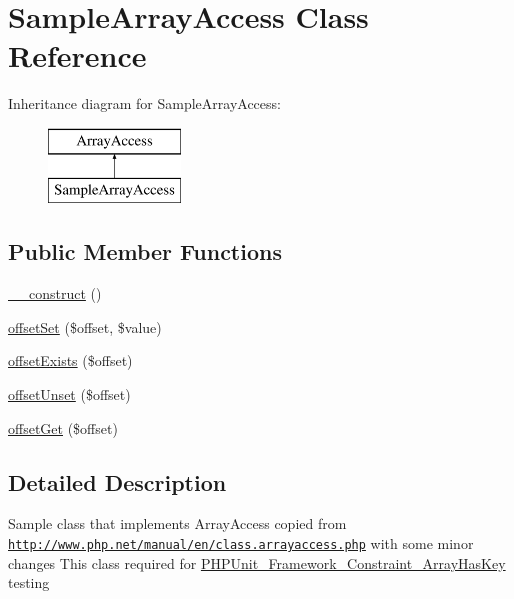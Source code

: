 \hypertarget{class_sample_array_access}{}\section{Sample\+Array\+Access Class Reference}
\label{class_sample_array_access}
Inheritance diagram for Sample\+Array\+Access\+:\begin{figure}[H]
\begin{center}
\leavevmode
\includegraphics[height=2.000000cm]{class_sample_array_access}
\end{center}
\end{figure}
\subsection*{Public Member Functions}
\begin{DoxyCompactItemize}
\item 
\mbox{\hyperlink{class_sample_array_access_a095c5d389db211932136b53f25f39685}{\+\_\+\+\_\+construct}} ()
\item 
\mbox{\hyperlink{class_sample_array_access_ac6bde6b1eb50eb5377e91771fe46b7a3}{offset\+Set}} (\$offset, \$value)
\item 
\mbox{\hyperlink{class_sample_array_access_a24ff257ec0c2221bc6fd7b1b4388e26e}{offset\+Exists}} (\$offset)
\item 
\mbox{\hyperlink{class_sample_array_access_a2411227ea7118b13495de9839fd4b563}{offset\+Unset}} (\$offset)
\item 
\mbox{\hyperlink{class_sample_array_access_a59aee6e89465b48f014699f41b521f87}{offset\+Get}} (\$offset)
\end{DoxyCompactItemize}


\subsection{Detailed Description}
Sample class that implements Array\+Access copied from \href{http://www.php.net/manual/en/class.arrayaccess.php}{\tt http\+://www.\+php.\+net/manual/en/class.\+arrayaccess.\+php} with some minor changes This class required for \mbox{\hyperlink{class_p_h_p_unit___framework___constraint___array_has_key}{P\+H\+P\+Unit\+\_\+\+Framework\+\_\+\+Constraint\+\_\+\+Array\+Has\+Key}} testing 


